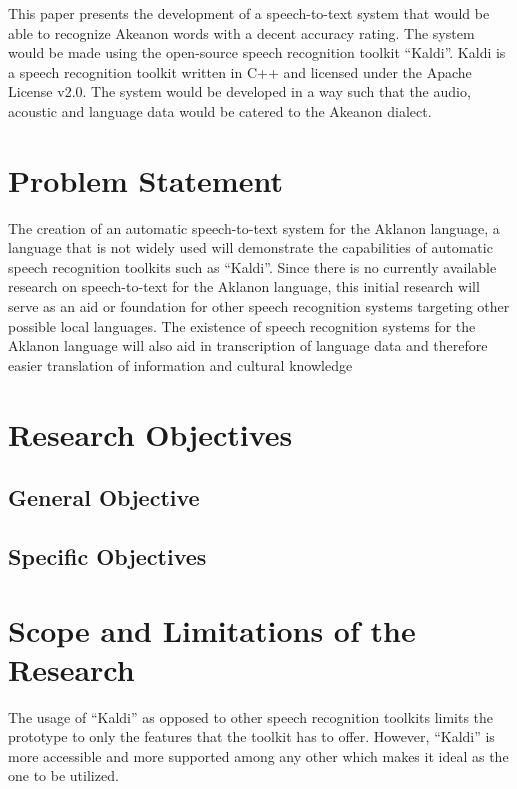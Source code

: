 This paper presents the development of a speech-to-text system that would be able to recognize Akeanon words with a decent accuracy rating. The system would be made using the open-source speech recognition toolkit “Kaldi”. Kaldi is a speech recognition toolkit written in C++ and licensed under the Apache License v2.0. The system would be developed in a way such that the audio, acoustic and language data would be catered to the Akeanon dialect.


\section{Problem Statement}

The creation of an automatic speech-to-text system for the Aklanon language, a language that is not widely used will demonstrate the capabilities of automatic speech recognition toolkits such as “Kaldi”.  Since there is no currently available research on speech-to-text for the Aklanon language, this initial research will serve as an aid or foundation for other speech recognition systems targeting other possible local languages. The existence of speech recognition systems for the Aklanon language will also aid in transcription of language data and therefore easier translation of information and cultural knowledge

\section{Research Objectives}


\subsection{General Objective}



\subsection{Specific Objectives}



\section{Scope and Limitations of the Research}

The usage of “Kaldi” as opposed to other speech recognition toolkits limits the prototype to only the features that the toolkit has to offer. However, “Kaldi” is more accessible and more supported among any other which makes it ideal as the one to be utilized.

